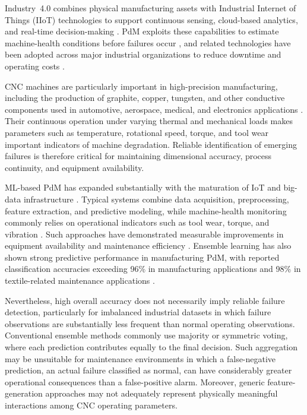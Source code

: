 \documentclass[final,5p, twocolumn]{elsarticle}
\begin{document}
Industry~4.0 combines physical manufacturing assets with Industrial Internet of Things (IIoT) technologies to support continuous sensing, cloud-based analytics, and real-time decision-making \cite{yan2017industrial,cinar2019digital,cinar2019simulation,karmakar2019industrial}. PdM exploits these capabilities to estimate machine-health conditions before failures occur \cite{tiddens2022exploring}, and related technologies have been adopted across major industrial organizations to reduce downtime and operating costs \cite{islam2025artificial,liu2018patent}.

CNC machines are particularly important in high-precision manufacturing, including the production of graphite, copper, tungsten, and other conductive components used in automotive, aerospace, medical, and electronics applications \cite{jha2011overview,meshram2012edm,dalenogare2018expected,cinar2019digital}. Their continuous operation under varying thermal and mechanical loads makes parameters such as temperature, rotational speed, torque, and tool wear important indicators of machine degradation. Reliable identification of emerging failures is therefore critical for maintaining dimensional accuracy, process continuity, and equipment availability.

ML-based PdM has expanded substantially with the maturation of IoT and big-data infrastructure \cite{Kausik2025}. Typical systems combine data acquisition, preprocessing, feature extraction, and predictive modeling, while machine-health monitoring commonly relies on operational indicators such as tool wear, torque, and vibration \cite{Arena2024-dy,wang2014force,assagaf2023machine}. Such approaches have demonstrated measurable improvements in equipment availability and maintenance efficiency \cite{lu2009predictive}. Ensemble learning has also shown strong predictive performance in manufacturing PdM, with reported classification accuracies exceeding 96\% in manufacturing applications \cite{hung2021improved} and 98\% in textile-related maintenance applications \cite{hung2022developing}.

Nevertheless, high overall accuracy does not necessarily imply reliable failure detection, particularly for imbalanced industrial datasets in which failure observations are substantially less frequent than normal operating observations. Conventional ensemble methods commonly use majority or symmetric voting, where each prediction contributes equally to the final decision. Such aggregation may be unsuitable for maintenance environments in which a false-negative prediction, an actual failure classified as normal, can have considerably greater operational consequences than a false-positive alarm. Moreover, generic feature-generation approaches may not adequately represent physically meaningful interactions among CNC operating parameters.
\end{document}
